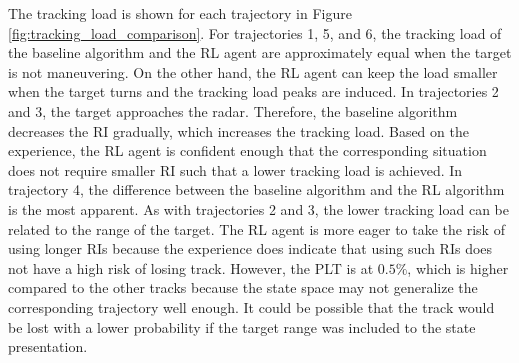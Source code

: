 \documentclass[english, 12pt, a4paper, elec, utf8, a-1b, online]{aaltothesis}
\numberwithin{equation}{section}
\begin{document}
The tracking load is shown for each trajectory in Figure \ref{fig:tracking_load_comparison}.
For trajectories 1, 5, and 6, the tracking load of the baseline algorithm and the RL agent are approximately equal when the target is not maneuvering.
On the other hand, the RL agent can keep the load smaller when the target turns and the tracking load peaks are induced.
In trajectories 2 and 3, the target approaches the radar. 
Therefore, the baseline algorithm decreases the RI gradually, which increases the tracking load.
Based on the experience, the RL agent is confident enough that the corresponding situation does not require smaller RI such that a lower tracking load is achieved.
In trajectory 4, the difference between the baseline algorithm and the RL algorithm is the most apparent.
As with trajectories 2 and 3, the lower tracking load can be related to the range of the target.
The RL agent is more eager to take the risk of using longer RIs because the experience does indicate that using such RIs does not have a high risk of losing track.
However, the PLT is at $0.5\%$, which is higher compared to the other tracks because the state space may not generalize the corresponding trajectory well enough.
It could be possible that the track would be lost with a lower probability if the target range was included to the state presentation.
\end{document}
